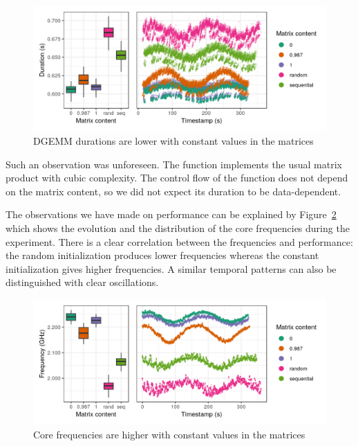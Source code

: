         \begin{figure}[htbp]
            \centering
            \includegraphics[width=\textwidth]{img/experiment/bit-flips/generation_method_perf.png}
            \caption{\label{fig:exp:bit-flips:method-perf}
            DGEMM durations are lower with constant values in the matrices}
        \end{figure}

        Such an observation was unforeseen. The function \dgemm implements the usual matrix product with cubic
        complexity. The control flow of the function does not depend on the matrix content, so we did not expect its
        duration to be data-dependent.

        The observations we have made on \dgemm performance can be explained by
        Figure~\ref{fig:exp:bit-flips:method-freq} which shows the evolution and the distribution of the core
        frequencies during the experiment. There is a clear correlation between the frequencies and \dgemm
        performance: the random initialization produces lower frequencies whereas the constant initialization gives
        higher frequencies. A similar temporal patterns can also be distinguished with clear oscillations.

        \begin{figure}[htbp]
            \centering
            \includegraphics[width=\textwidth]{img/experiment/bit-flips/generation_method_freq.png}
            \caption{\label{fig:exp:bit-flips:method-freq}
            Core frequencies are higher with constant values in the matrices}
        \end{figure}

